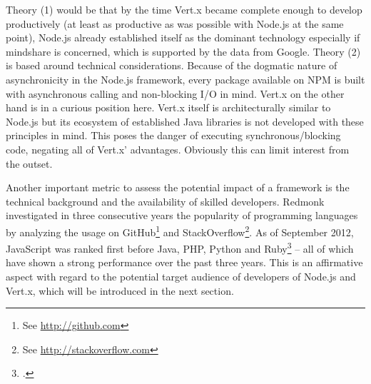 Theory (1) would be that by the time Vert.x became complete enough to develop
productively (at least as productive as was possible with Node.js at the same
point), Node.js already established itself as the dominant technology especially if
mindshare is concerned, which is supported by the data from Google.
Theory (2) is based around technical considerations. Because of the dogmatic
nature of asynchronicity in the Node.js framework, every package available on
NPM is built with asynchronous calling
and non-blocking I/O in mind. Vert.x on the
other hand is in a curious position here. Vert.x itself is architecturally
similar to Node.js but its ecosystem of established Java libraries is not developed
with these principles in mind. This poses the danger of executing
synchronous/blocking code, negating all of Vert.x' advantages. Obviously this
can limit interest from the outset.

Another important metric to assess the potential impact of a framework is the
technical background and the availability of skilled developers. Redmonk
investigated in three consecutive years the popularity of programming languages
by analyzing the usage on GitHub\footnote{See \url{http://github.com}} and
StackOverflow\footnote{See \url{http://stackoverflow.com}}. As of September
2012, JavaScript was ranked first before Java, PHP, Python and
Ruby\footcite[Cf.][]{Redmonk_2012} – all of which have shown a strong
performance over the past three years. This is an affirmative aspect with regard
to the potential target audience of developers of Node.js and Vert.x, which will
be introduced in the next section.


